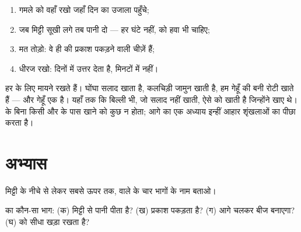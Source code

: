 \begin{method}[पौधे की देखभाल]\label{met:g1:plants-around-us:care}
\begin{enumerate}
  \item गमले को वहाँ रखो जहाँ दिन का उजाला पहुँचे;
  \item जब मिट्टी सूखी लगे तब पानी दो --- हर घंटे नहीं,  को हवा
        भी चाहिए;
  \item {} मत तोड़ो: वे ही  की प्रकाश पकड़ने वाली चीज़ें
        हैं;
  \item धीरज रखो:  दिनों में उत्तर देता है, मिनटों में नहीं।
\end{enumerate}
\end{method}

\begin{remark}\label{rem:g1:plants-around-us:food}
 हर  के लिए मायने रखते हैं। घोंघा सलाद खाता है, कलचिड़ी
जामुन खाती है, हम गेहूँ की बनी रोटी खाते हैं --- और गेहूँ एक 
है। यहाँ तक कि बिल्ली भी, जो सलाद नहीं खाती, ऐसे  को खाती है
जिन्होंने  खाए थे।  के बिना किसी और के पास खाने को कुछ न
होता; आगे का एक अध्याय इन्हीं आहार शृंखलाओं का पीछा करता है।
\end{remark}

\section{अभ्यास}

\begin{exercise}[$\star$]\label{exo:g1:plants-around-us:1}
मिट्टी के नीचे से लेकर सबसे ऊपर तक,  वाले  के चार भागों के नाम
बताओ।
\end{exercise}

\begin{exercise}[$\star$]\label{exo:g1:plants-around-us:2}
 का कौन-सा भाग: (क) मिट्टी से पानी पीता है? (ख) प्रकाश पकड़ता
है? (ग) आगे चलकर बीज बनाएगा? (घ)  को सीधा खड़ा रखता है?
\end{exercise}

